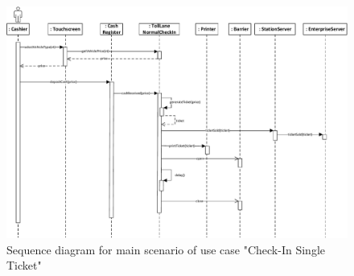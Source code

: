 \begin{figure}[H]
\centerline{\includegraphics[width=1.4\columnwidth]{"img/sequence_diagrams/sequence_diagram_single_ticket_check_in_cash"}}
\caption{Sequence diagram for main scenario of use case "Check-In Single Ticket"}
\label{fig:seq_single_ticket_main}
\end{figure}

